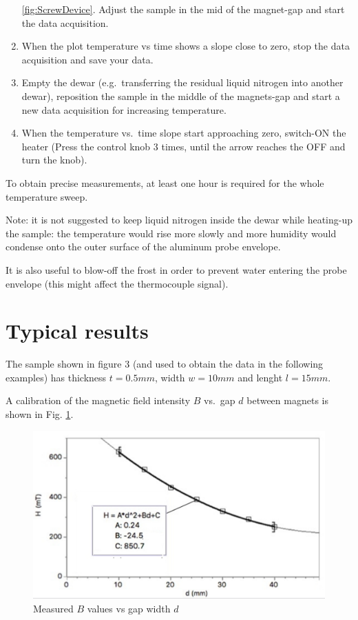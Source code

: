 \documentclass[]{book}
\begin{document}
\begin{enumerate}
  \ref{fig:ScrewDevice}. Adjust the sample in the mid of the magnet-gap
  and start the data acquisition.
\item
  When the plot temperature vs time shows a slope close to zero, stop
  the data acquisition and save your data.
\item
  Empty the dewar (e.g.~transferring the residual liquid nitrogen into
  another dewar), reposition the sample in the middle of the magnets-gap
  and start a new data acquisition for increasing temperature.
\item
  When the temperature vs.~time slope start approaching zero, switch-ON
  the heater (Press the control knob 3 times, until the arrow reaches
  the OFF and turn the knob).
\end{enumerate}

To obtain precise measurements, at least one hour is required for the
whole temperature sweep.

Note: it is not suggested to keep liquid nitrogen inside the dewar while
heating-up the sample: the temperature would rise more slowly and more
humidity would condense onto the outer surface of the aluminum probe
envelope.

It is also useful to blow-off the frost in order to prevent water
entering the probe envelope (this might affect the thermocouple signal).

\section{Typical results}\label{typical-results}

The sample shown in figure 3 (and used to obtain the data in the
following examples) has thickness \(t=0.5mm\), width \(w=10mm\) and
lenght \(l=15mm\).

A calibration of the magnetic field intensity \(B\) vs.~gap \(d\)
between magnets is shown in Fig. \ref{fig:BvsGapD}.

\begin{figure}

{\centering \includegraphics[width=0.65\linewidth]{Assets/Figures/H_vs_d} 

}

\caption{Measured $B$ values vs gap width $d$}\label{fig:BvsGapD}
\end{figure}
\end{document}
